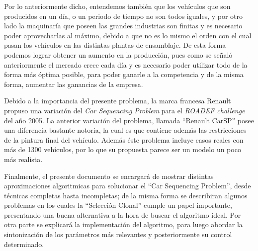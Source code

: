 Por lo anteriormente dicho, entendemos también que los vehículos que son producidos en un día,
o un periodo de tiempo no son todos iguales, y por otro lado la maquinaría que poseen las grandes industrias son
finitas y es necesario poder aprovecharlas al máximo, debido a que no es lo mismo el orden con el cual pasan
los vehículos en las distintas plantas de ensamblaje.
De esta forma podemos lograr obtener un aumento en la producción, pues como
se señaló anteriormente el mercado crece cada día y es necesario poder utilizar todo de la forma
más óptima posible, para poder ganarle a la competencia y de la misma forma, aumentar las ganancias
de la empresa.

Debido a la importancia del presente problema, la marca francesa Renault propuso una variación del \emph{Car Sequencing Problem}
para el \emph{ROADEF challenge} del año 2005. La anterior variación del problema, llamada ``Renault CarSP'' posee una
diferencia bastante notoria, la cual es que contiene además las restricciones de la pintura final del vehículo.
Además éste problema incluye casos reales con más de 1300 vehículos, por lo que su propuesta parece ser un modelo un poco
más realista.

Finalmente, el presente documento se encargará de mostrar distintas aproximaciones algoritmicas
para solucionar el ``Car Sequencing Problem'', desde técnicas completas hasta incompletas;
de la misma forma se describiran algunos problemas en los cuales la ``Selección Clonal'' cumple
un papel importante, presentando una buena alternativa a la hora de buscar el algoritmo ideal.
Por otra parte se explicará la implementación del algoritmo, para luego abordar la sintonización
de los parámetros más relevantes y posteriormente su control determinado.

